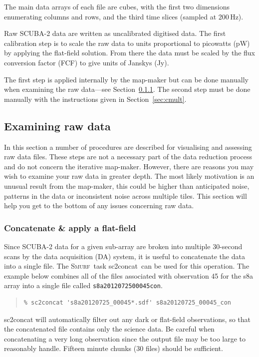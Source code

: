 \documentclass[twoside,11pt]{article}
\newcommand{\htmlref}[2]{#1}
\newcommand{\latexhtml}[2]{#1}
\newcommand{\xref}[3]{#1}
\newcommand{\xlabel}[1]{}
\renewcommand{\_}{\texttt{\symbol{95}}}
\newenvironment{myquote}{\begin{quote}\begin{small}}{\end{small}\end{quote}}
\newcommand{\smurf}{\xref{\textsc{Smurf}}{sun258}{}}
\newcommand{\task}[1]{\textsf{#1}}
\newcommand{\concat}{\xref{\task{sc2concat}}{sun258}{SC2CONCAT}}
\newcommand{\cref}[3]{\latexhtml{#1~\ref{#2}}{\htmlref{#3}{#2}}}
\begin{document}
The main data arrays of each file are cubes, with the first two
dimensions enumerating columns and rows, and the third time slices
(sampled at 200\,Hz).

Raw SCUBA-2 data are written as uncalibrated digitised data. The first calibration
step is to scale the raw data to units proportional to picowatts (pW)
by applying the flat-field solution. From there the data must be
scaled by the flux conversion factor (FCF) to give units of Janskys
(Jy).

The first step is applied internally by the map-maker but can be done
manually when examining the raw data---see
\cref{Section}{sec:concat}{Concatenate \& apply a flat-field}.
The second step must be done manually with the instructions given in
\cref{Section}{sec:cmult}{Applying the FCF and determining fluxes}.


\subsection{\xlabel{examine}Examining raw data}
\label{sec:exam}

In this section a number of procedures are described for visualising
and assessing raw data files. These steps are not a necessary part of
the data reduction process and do not concern the iterative map-maker.
However, there are reasons you may wish to examine your raw data in
greater depth. The most likely motivation is an unusual result from the
map-maker, this could be higher than anticipated noise, patterns in
the data or inconsistent noise across multiple tiles. This section
will help you get to the bottom of any issues concerning raw data.

\subsubsection{\xlabel{concat}Concatenate \& apply a flat-field}
\label{sec:concat}

Since SCUBA-2 data for a given sub-array are broken into multiple
30-second scans by the data acquisition (DA) system, it is useful to
concatenate the data into a single file. The \smurf\ task \concat\ can
be used for this operation. The example below combines all of the
files associated with observation 45 for the s8a array into a single
file called \texttt{s8a20120725\_00045\_con}.

\begin{myquote}
\begin{verbatim}
% sc2concat 's8a20120725_00045*.sdf' s8a20120725_00045_con
\end{verbatim}
\end{myquote}
\task{sc2concat} will automatically filter out any dark or flat-field
observations, so that the concatenated file contains only the science
data. Be careful when concatenating a very long observation since the
output file may be too large to reasonably handle. Fifteen minute
chunks (30 files) should be sufficient.
\end{document}
